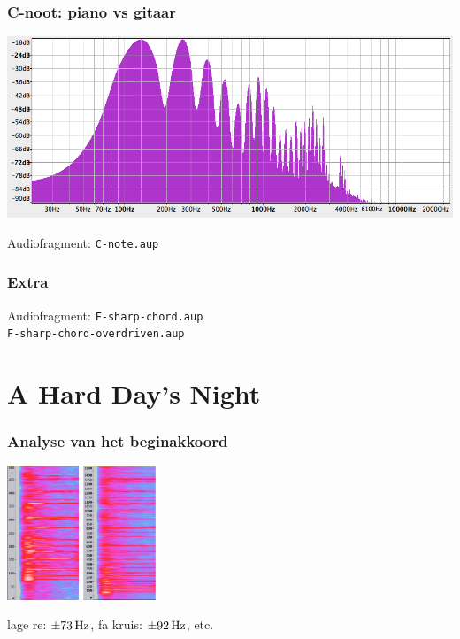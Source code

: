 \documentclass[compress, darktitle, framenumber, totalframenumber]{beamer}
\begin{document}
\begin{frame}
\frametitle{C-noot: piano vs gitaar}
\includegraphics[width=\textwidth]{images2/C-note.png}
\begin{block}{Audiofragment:}
\texttt{C-note.aup} 
\end{block}
\end{frame}


\begin{frame}
\frametitle{Extra}
\begin{block}{Audiofragment:}
\texttt{F-sharp-chord.aup} \\
\texttt{F-sharp-chord-overdriven.aup} \\
\end{block}
\end{frame}

\section{A Hard Day's Night}

\begin{frame}
  \frametitle{Analyse van het beginakkoord}

  \begin{center}
    \includegraphics[height=4cm]{images/beatles-500} \qquad \includegraphics[height=4cm]{images/beatles-1500}
  \end{center}

  lage re: $\SI{\pm 73}{\hertz}$, fa kruis: $\SI{\pm 92}{\hertz}$, etc.
\end{frame}
\end{document}
